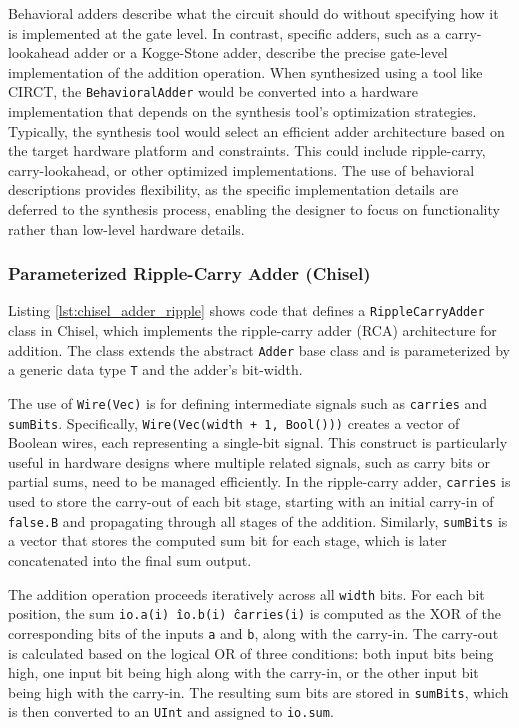 {Behavioral adders describe what the circuit should do without specifying how it is implemented at the gate level. In contrast, specific adders, such as a carry-lookahead adder or a Kogge-Stone adder, describe the precise gate-level implementation of the addition operation. When synthesized using a tool like CIRCT, the \texttt{BehavioralAdder} would be converted into a hardware implementation that depends on the synthesis tool's optimization strategies. Typically, the synthesis tool would select an efficient adder architecture based on the target hardware platform and constraints. This could include ripple-carry, carry-lookahead, or other optimized implementations. The use of behavioral descriptions provides flexibility, as the specific implementation details are deferred to the synthesis process, enabling the designer to focus on functionality rather than low-level hardware details.

\subsubsection{Parameterized Ripple-Carry Adder (Chisel)}

Listing \ref{lst:chisel_adder_ripple} shows code that defines a \texttt{RippleCarryAdder} class in Chisel, which implements the ripple-carry adder (RCA) architecture for addition. The class extends the abstract \texttt{Adder} base class and is parameterized by a generic data type \texttt{T} and the adder's bit-width. 

The use of \texttt{Wire(Vec)} is for defining intermediate signals such as \texttt{carries} and \texttt{sumBits}. Specifically, \texttt{Wire(Vec(width + 1, Bool()))} creates a vector of Boolean wires, each representing a single-bit signal. This construct is particularly useful in hardware designs where multiple related signals, such as carry bits or partial sums, need to be managed efficiently. In the ripple-carry adder, \texttt{carries} is used to store the carry-out of each bit stage, starting with an initial carry-in of \texttt{false.B} and propagating through all stages of the addition. Similarly, \texttt{sumBits} is a vector that stores the computed sum bit for each stage, which is later concatenated into the final sum output.

The addition operation proceeds iteratively across all \texttt{width} bits. For each bit position, the sum \texttt{io.a(i) \^ io.b(i) \^ carries(i)} is computed as the XOR of the corresponding bits of the inputs \texttt{a} and \texttt{b}, along with the carry-in. The carry-out is calculated based on the logical OR of three conditions: both input bits being high, one input bit being high along with the carry-in, or the other input bit being high with the carry-in. The resulting sum bits are stored in \texttt{sumBits}, which is then converted to an \texttt{UInt} and assigned to \texttt{io.sum}. 




}%

